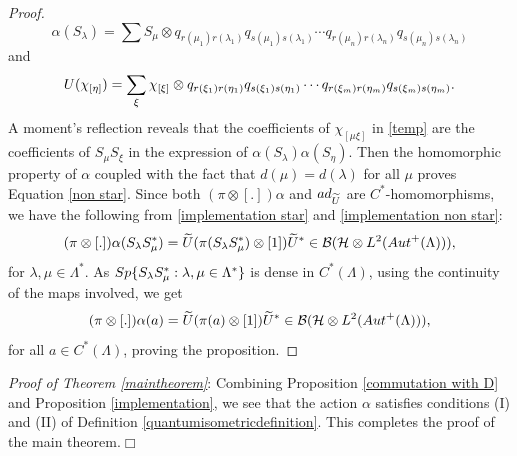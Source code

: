 \documentclass{amsart}
\theoremstyle{plain}
\theoremstyle{definition}
\theoremstyle{remark}
\numberwithin{equation}{section}
\newcommand{\cal}{\mathcal}
\newcommand{\clb}{{\cal B}}
\newcommand{\clh}{{\cal H}}
\def \qed {$\Box$}
\begin{document}
\begin{proof}
\begin{displaymath}  
\alpha(S_{\lambda})=\sum S_{\mu}\otimes q_{r(\mu_{1})r(\lambda_{1})}q_{s(\mu_{1})s(\lambda_{1})}\cdots q_{r(\mu_{n})r(\lambda_{n})}q_{s(\mu_{n})s(\lambda_{n})}
\end{displaymath} 
and 
\begin{displaymath}
U(\chi_{[\eta]})=\sum\limits_{\xi}\chi_{[\xi]}\otimes q_{r(\xi_{1})r(\eta_{1})}q_{s(\xi_{1})s(\eta_{1})}\cdots \\
    q_{r(\xi_{m})r(\eta_{m})}q_{s(\xi_{m})s(\eta_{m})}.
\end{displaymath} 
A moment's reflection reveals that the coefficients of $\chi_{[\mu\xi]}$ in \ref{temp} are the coefficients of $S_{\mu}S_{\xi}$ in the expression of $\alpha(S_{\lambda})\alpha(S_{\eta})$. Then the homomorphic property of $\alpha$ coupled with the fact that $d(\mu)=d(\lambda)$ for all $\mu$ proves Equation \ref{non star}.  
Since both $(\pi\otimes[.])\alpha$ and ${\rm ad}_{\widetilde{U}}$ are $C^{\ast}$-homomorphisms, we have the following from \ref{implementation star} and \ref{implementation non star}:
\begin{displaymath}
 (\pi\otimes[.])\alpha(S_{\lambda}S_{\mu}^{\ast})=\widetilde{U}(\pi(S_{\lambda}S_{\mu}^{\ast})\otimes[1])\widetilde{U}^{\ast}\in \clb(\clh\otimes L^{2}({\rm Aut}^{+}(\Lambda))),   
\end{displaymath}
for $\lambda,\mu\in\Lambda^{\ast}$. As ${\rm Sp}\{S_{\lambda}S_{\mu}^{\ast}:\lambda,\mu\in\Lambda^{\ast}\}$ is dense in $C^{\ast}(\Lambda)$, using the continuity of the maps involved, we get
\begin{displaymath}
 (\pi\otimes[.])\alpha(a)=\widetilde{U}(\pi(a)\otimes[1])\widetilde{U}^{\ast}\in \clb(\clh\otimes L^{2}({\rm Aut}^{+}(\Lambda))),   
\end{displaymath}
for all $a\in C^{\ast}(\Lambda)$, proving the proposition.
\end{proof} 
 {\it Proof of Theorem \ref{maintheorem}}: Combining Proposition \ref{commutation with D} and Proposition \ref{implementation}, we see that the action $\alpha$ satisfies conditions (I) and (II) of Definition \ref{quantumisometricdefinition}. This completes the proof of the main theorem.\qed
\end{document}
